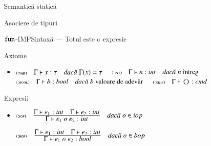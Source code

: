 \begin{section}{Semantică statică}
\begin{subsection}{Asociere de tipuri}
\begin{frame}[fragile]{$\mathrel{\text{\ttfamily fun}}$-IMP}{Sintaxă --- Totul este o expresie}
\vspace{-5ex}
\end{frame}



\begin{frame}{Axiome}
\begin{itemize}
\item[] $\reg[:var]{\T{\Gamma}{x}{\tau}}{}{\Gamma(x) = \tau}$
\vitem[] $\reg[:int]{\T{\Gamma}{n}{int}}{}{\mbox{$n$ întreg}}$
\vitem[] $\reg[:bool]{\T{\Gamma}{b}{bool}}{}{\mbox{$b$ valoare de adevăr}}$
\vitem[] $\reg[:skip]{\T{\Gamma}{\Sskip}{cmd}}{}{}$
\end{itemize}
\end{frame}


\begin{frame}
{Expresii}
\begin{itemize}
\item[]
$\reg[:iop]{\T{\Gamma}{e_1\mathrel{o} e_2}{int}}{\T{\Gamma}{e_1}{int} \si \T{\Gamma}{e_2}{int}}{o\in iop}$

\vitem[]
$\reg[:bop]{\T{\Gamma}{e_1\mathrel{o} e_2}{bool}}{\T{\Gamma}{e_1}{int} \si \T{\Gamma}{e_2}{int}}{o\in bop}$


\end{itemize}
\end{frame}
\end{subsection}
\end{section}
